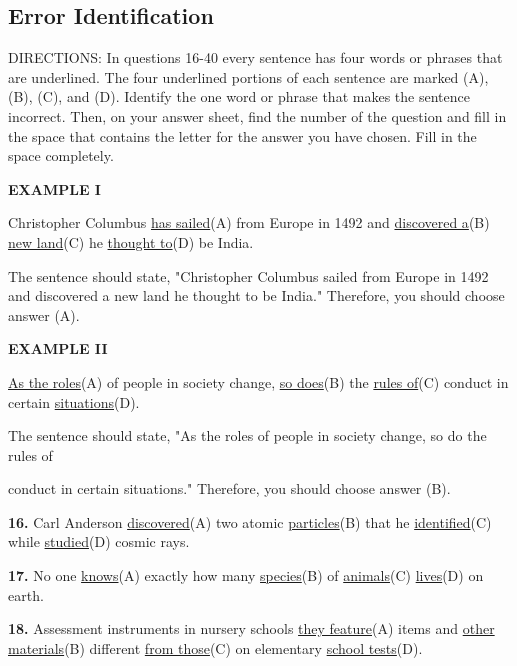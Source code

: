 \documentclass[12pt]{article}
\begin{document}
\subsection*{Error Identification}
DIRECTIONS: In questions 16-40 every sentence has four words or phrases that are underlined. The four underlined portions of each sentence are marked (A), (B), (C), and (D). Identify the one word or phrase that makes the sentence incorrect. Then, on your answer sheet, find the number of the question and fill in the space that contains the letter for the answer you have chosen. Fill in the space completely.\par
\begin{exampleblock}
\textbf{EXAMPLE I}\par
Christopher Columbus \uline{has sailed}(A) from Europe in 1492 and \uline{discovered a}(B) \uline{new land}(C) he \uline{thought to}(D) be India.\par
The sentence should state, "Christopher Columbus sailed from Europe in 1492 and discovered a new land he thought to be India." Therefore, you should choose answer (A).\par
\end{exampleblock}
\begin{exampleblock}
\textbf{EXAMPLE II}\par
\uline{As the roles}(A) of people in society change, \uline{so does}(B) the \uline{rules of}(C) conduct in certain \uline{situations}(D).\par
The sentence should state, "As the roles of people in society change, so do the rules of\par
conduct in certain situations." Therefore, you should choose answer (B).\par
\end{exampleblock}
\noindent\textbf{16.} Carl Anderson \uline{discovered}(A) two atomic \uline{particles}(B) that he \uline{identified}(C) while \uline{studied}(D) cosmic rays.
\par
\vspace{\questionblockgap}
\noindent\textbf{17.} No one \uline{knows}(A) exactly how many \uline{species}(B) of \uline{animals}(C) \uline{lives}(D) on earth.
\par
\vspace{\questionblockgap}
\noindent\textbf{18.} Assessment instruments in nursery schools \uline{they feature}(A) items and \uline{other materials}(B) different \uline{from those}(C) on elementary \uline{school tests}(D).
\par
\end{document}

